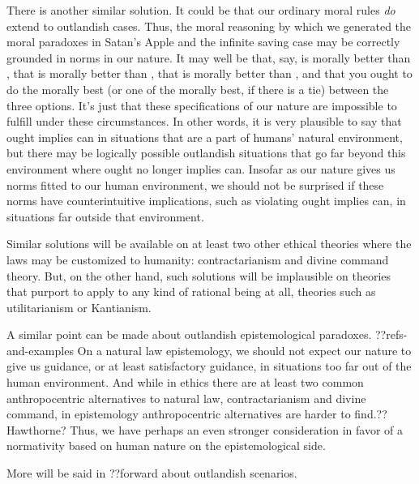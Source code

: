 There is another similar solution. It could be that our ordinary moral rules \textit{do} extend to outlandish
cases. Thus, the moral reasoning by which we generated the moral paradoxes in Satan's Apple and the 
infinite saving case may be correctly grounded in norms in our nature. It may well be that, say,
 is morally better than , that  is morally better than , 
that  is morally better than , and that you ought to do the morally best (or one
of the morally best, if there is a tie) between the three options. It's just that these specifications of 
our nature are impossible to fulfill under these circumstances. In other words, it is very plausible to
say that ought implies can in situations that are a part of humans' natural environment, but there may be
logically possible outlandish situations that go far beyond this environment where ought no longer implies can. 
Insofar as our nature gives us norms fitted to our human environment, we should not be surprised if these norms
have counterintuitive implications, such as violating ought implies can, in situations far outside that environment.

Similar solutions will be available on at least two other ethical theories where the laws may be customized
to humanity: contractarianism and divine command theory. But, on the other hand, such solutions will be
implausible on theories that purport to apply to any kind of rational being at all, theories such as utilitarianism
or Kantianism. 

A similar point can be made about outlandish epistemological paradoxes. ??refs-and-examples  On a natural law epistemology, we should not expect our nature to give us guidance, or at least satisfactory guidance, 
in situations too far out of the human environment. And while in ethics there are at least two common anthropocentric alternatives to natural law, contractarianism and divine command, in epistemology anthropocentric alternatives are harder to find.??Hawthorne?
Thus, we have perhaps an even stronger consideration in favor of a normativity based on human nature on the epistemological
side. 

More will be said in ??forward about outlandish scenarios.


\chaptertail 